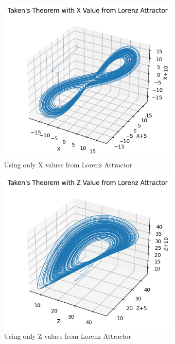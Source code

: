 \begin{figure}[H]
    \begin{subfigure}{0.45\textwidth}
        \includegraphics[width=\linewidth]{images/task4_takensX.png}
        \caption{Using only X values from Lorenz Attractor}
        \label{task4_4}
    \end{subfigure}
    \begin{subfigure}{0.45\textwidth}
        \includegraphics[width=\linewidth]
        {images/task4_takensZ.png}
        \caption{Using only Z values from Lorenz Attractor}
        \label{task4_5}
    \end{subfigure}

    \caption{}
\end{figure}






